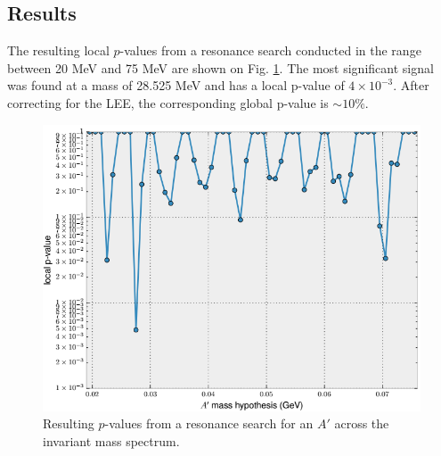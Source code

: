 
 


\subsection{Results}

The resulting local $p$-values from a resonance search conducted in the range 
between 20 MeV and 75 MeV are shown on Fig. \ref{fig:local_p_values}. 
The most significant signal
was found at a mass of 28.525 MeV and has a local p-value of $4 \times 10^{-3}$.
After correcting for the LEE, the corresponding global p-value is 
$\sim 10\%$.
\begin{figure}[t]
    \centering
    \includegraphics[width=.8\textwidth]{images/final_p_values.png}
    \caption{Resulting $p$-values from a resonance search for an $A'$ across the
    invariant mass spectrum.}
    \label{fig:local_p_values}
\end{figure}


